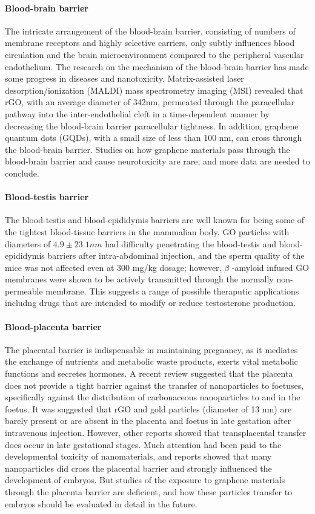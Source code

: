 \documentclass[twoside,twocolumn,9pt]{article}
\begin{document}
\paragraph{Blood-brain barrier}The intricate arrangement of the blood-brain barrier, consisting of numbers of membrane receptors and highly selective carriers, only subtly influences blood circulation and the brain microenvironment compared to the peripheral vascular endothelium. The research on the mechanism of the blood-brain barrier has made some progress in diseases and nanotoxicity. Matrix-assisted laser desorption/ionization (MALDI) mass spectrometry imaging (MSI) revealed that rGO, with an average diameter of 342nm, permeated through the paracellular pathway into the inter-endothelial cleft in a time-dependent manner by decreasing the blood-brain barrier paracellular tightness. In addition, graphene quantum dots (GQDs), with a small size of less than 100 nm, can cross through the blood-brain barrier. Studies on how graphene materials pass through the blood-brain barrier and cause neurotoxicity are rare, and more data are needed to conclude.

\paragraph{Blood-testis barrier}The blood-testis and blood-epididymis barriers are well known for being some of the tightest blood-tissue barriers in the mammalian body. GO particles with diameters of $4.9 \pm 23.1 nm$ had difficulty penetrating the blood-testis and blood-epididymis barriers after intra-abdominal injection, and the sperm quality of the mice was not affected even at 300 mg/kg dosage; however, $\beta$ -amyloid infused GO membranes were shown to be actively transmitted through the normally non-permeable membrane. This suggests a range of possible theraputic applications includng drugs that are intended to modify or reduce testosterone production.



\paragraph{Blood-placenta barrier}The placental barrier is indispensable in maintaining pregnancy, as it mediates the exchange of nutrients and metabolic waste products, exerts vital metabolic functions and secretes hormones. A recent review suggested that the placenta does not provide a tight barrier against the transfer of nanoparticles to foetuses, specifically against the distribution of carbonaceous nanoparticles to and in the foetus. It was suggested that rGO and gold particles (diameter of 13 nm) are barely present or are absent in the placenta and foetus in late gestation after intravenous injection. However, other reports showed that transplacental transfer does occur in late gestational stages. Much attention had been paid to the developmental toxicity of nanomaterials, and reports showed that many nanoparticles did cross the placental barrier and strongly influenced the development of embryos. But studies of the exposure to graphene materials through the placenta barrier are deficient, and how these particles transfer to embryos should be evaluated in detail in the future.
\end{document}
